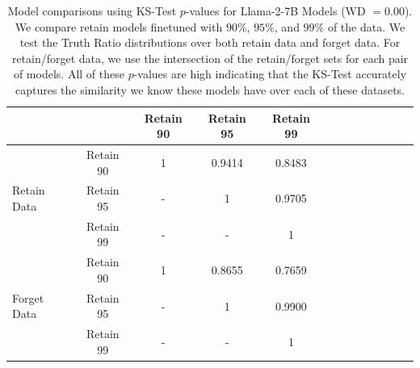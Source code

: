 \begin{table}[t!]
\centering
\caption{Model comparisons using KS-Test $p$-values for Llama-2-7B Models (WD $= 0.00$). We compare retain models finetuned with $90\%$, $95\%$, and $99\%$ of the data. We test the Truth Ratio distributions over both retain data and forget data. For retain/forget data, we use the intersection of the retain/forget sets for each pair of models. All of these $p$-values are high indicating that the KS-Test accurately captures the similarity we know these models have over each of these datasets.}
\label{tab:llama-pvals-1}
\footnotesize
\begin{tabular}{lcccccccccccc}
\toprule
                    &    & Retain 90 & Retain 95 & Retain 99   \\
\midrule
                    &   Retain 90 & 1             & 0.9414        & 0.8483        \\
Retain Data         &   Retain 95 & -             & 1             & 0.9705        \\
                    &   Retain 99 & -             & -             & 1             \\
\midrule
                    &   Retain 90 & 1             & 0.8655        & 0.7659       \\
Forget Data         &   Retain 95 & -             & 1             & 0.9900       \\
                    &   Retain 99 & -             & -             & 1            \\
\bottomrule
\end{tabular}
\end{table}

